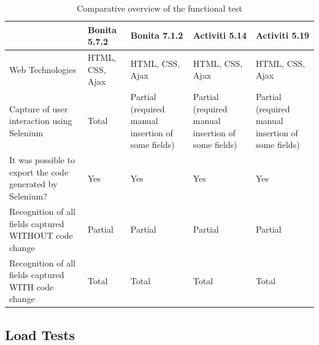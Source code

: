 \documentclass[runningheads,a4paper]{llncs}
\begin{document}
\begin{table}
\centering
\begin{center}
\begin{tabular}{p{3cm}|p{2cm}|p{2.5cm}|p{2.5cm}|p{2.5cm}}
\hline
 & Bonita 5.7.2 & Bonita 7.1.2 & Activiti 5.14 & Activiti 5.19 \\\hline
Web Technologies & HTML, CSS, Ajax & HTML, CSS, Ajax & HTML, CSS, Ajax & HTML, CSS, Ajax \\\hline
Capture of user interaction using Selenium & Total & Partial (required manual insertion of some fields) & Partial (required manual insertion of some fields) & Partial (required manual insertion of some fields) \\\hline
It was possible to export the code generated by Selenium? & Yes & Yes & Yes & Yes\\\hline
Recognition of all fields captured WITHOUT code change & Partial & Partial & Partial & Partial \\\hline
Recognition of all fields captured WITH code change & Total & Total & Total & Total \\\hline
\end{tabular}
\caption{Comparative overview of the functional test}
\label{tab:testeFuncional}
\end{center}
\end{table}


\subsection{Load Tests}
\end{document}
